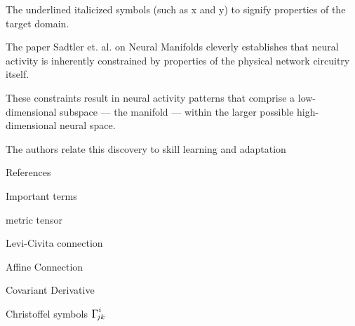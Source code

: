 \documentclass{amsart}
\newcommand{\Christoffel}[2]{\ensuremath{{\mathlarger{\mathlarger\Gamma}}^{#1}\!\!\!_{#2}}}
\begin{document}
The underlined italicized symbols (such as x and y) to signify properties of the target domain.




The paper Sadtler et. al. on Neural Manifolds cleverly establishes that neural activity is inherently constrained by properties of the physical network circuitry itself.

These constraints result in neural activity patterns that comprise a low-dimensional subspace — the manifold — within the larger possible high-dimensional neural space.

The authors relate this discovery to skill learning and adaptation


\clearpage

References






\clearpage

Important terms

metric tensor

Levi-Civita connection

Affine Connection

Covariant Derivative

Christoffel symbols $ \Christoffel{i}{jk} $
\end{document}
